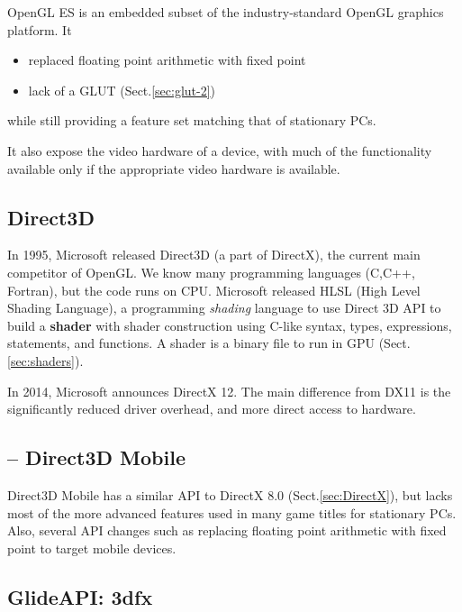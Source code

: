 OpenGL ES is an embedded subset of the industry-standard OpenGL 
graphics platform. It 
\begin{itemize}
  \item   replaced floating  point  arithmetic with fixed point 
  
  \item lack of a GLUT (Sect.\ref{sec:glut-2})
\end{itemize}
while still providing a feature set matching that 
of stationary PCs.

It also expose  the  video  hardware  of  a device,  with  much  of  the 
functionality  available  only  if  the appropriate  video  hardware  is 
available.

\subsection{Direct3D}
\label{sec:Direct3D}

In 1995, Microsoft released Direct3D (a part of DirectX), the current main
competitor of OpenGL. We know many programming languages (C,C++, Fortran), but
the code runs on CPU. Microsoft released HLSL (High Level Shading Language), a
programming {\it shading} language to use Direct 3D API to build a {\bf shader}
with shader construction using C-like syntax, types, expressions, statements,
and functions. A shader is a binary file to run in GPU (Sect.\ref{sec:shaders}).


In 2014,  Microsoft announces DirectX 12.
The main difference from DX11 is the significantly reduced driver overhead, and
more direct access to hardware.

\subsection{-- Direct3D Mobile}
\label{sec:Direct3D-Mobile}

Direct3D  Mobile   has  a  similar  API  to  DirectX  8.0
(Sect.\ref{sec:DirectX}), but lacks most of the  more advanced  features  used 
in  many  game  titles  for  stationary PCs.
Also, several API changes such as replacing floating point 
arithmetic with fixed point to target mobile devices.




\subsection{GlideAPI: 3dfx}
\label{sec:3dfx}
\label{sec:GlideAPI}

